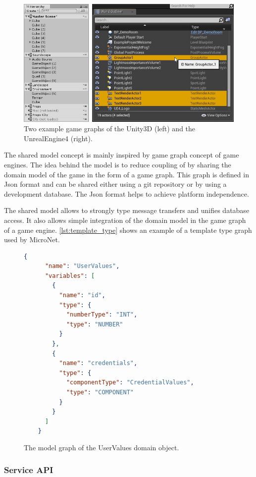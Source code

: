 \begin{figure}
  \centering
  \includegraphics[width=\textwidth]{images/game_engine/scenegraph}
  \caption{Two example game graphs of the Unity3D (left) and the UnrealEngine4
  (right).}
  \label{fig:scenegraph}
\end{figure}

The shared model concept is mainly inspired by game graph concept of game
engines. The idea behind the model is to reduce coupling of \ms{} by sharing the
domain model of the game in the form of a game graph. This graph is defined in
Json format and can be shared either using a git repository or by using a
development database. The Json format helps to achieve platform independence.

The shared model allows to strongly type message transfers and unifies database
access. It also allows simple integration of the domain model in the game graph
of a game engine. \autoref{lst:template_type} shows an example of a template
type graph used by MicroNet.

\begin{figure}
	\begin{lstlisting}[language=json,firstnumber=1] 
	{
	  "name": "UserValues",
	  "variables": [
	    {
	      "name": "id",
	      "type": {
	        "numberType": "INT",
	        "type": "NUMBER"
	      }
	    },
	    {
	      "name": "credentials",
	      "type": {
	        "componentType": "CredentialValues",
	        "type": "COMPONENT"
	      }
	    }
	  ]
	}
	\end{lstlisting}
  	\caption{The model graph of the UserValues domain object.}
  	\label{lst:template_type}
\end{figure}

\subsubsection{Service API}

